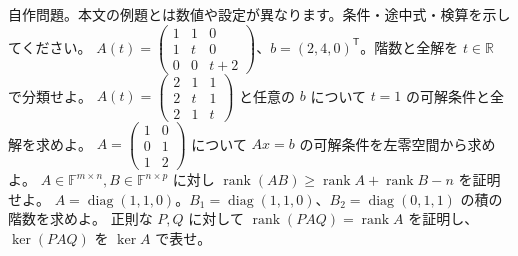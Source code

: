 \documentclass[11pt]{article}
\begin{document}
自作問題。本文の例題とは数値や設定が異なります。条件・途中式・検算を示してください。
\problem[2つの例外値]
$A(t)=\begin{pmatrix}1&1&0\\1&t&0\\0&0&t+2\end{pmatrix}$、$b=(2,4,0)^{\mathsf T}$。階数と全解を $t\in\mathbb R$ で分類せよ。
\workspace{45mm}
\problem[階数1への落下]
$A(t)=\begin{pmatrix}2&1&1\\2&t&1\\2&1&t\end{pmatrix}$ と任意の $b$ について $t=1$ の可解条件と全解を求めよ。
\workspace{45mm}
\newpage
\problem[左零空間]
$A=\begin{pmatrix}1&0\\0&1\\1&2\end{pmatrix}$ について $Ax=b$ の可解条件を左零空間から求めよ。
\workspace{45mm}
\problem[積の階数下限]
$A\in\mathbb F^{m\times n},B\in\mathbb F^{n\times p}$ に対し $\operatorname{rank}(AB)\ge\operatorname{rank}A+\operatorname{rank}B-n$ を証明せよ。
\workspace{45mm}
\newpage
\problem[上限と下限の達成]
$A=\operatorname{diag}(1,1,0)$。$B_1=\operatorname{diag}(1,1,0)$、$B_2=\operatorname{diag}(0,1,1)$ の積の階数を求めよ。
\workspace{45mm}
\problem[正則変換]
正則な $P,Q$ に対して $\operatorname{rank}(PAQ)=\operatorname{rank}A$ を証明し、$\ker(PAQ)$ を $\ker A$ で表せ。
\workspace{45mm}
\end{document}
